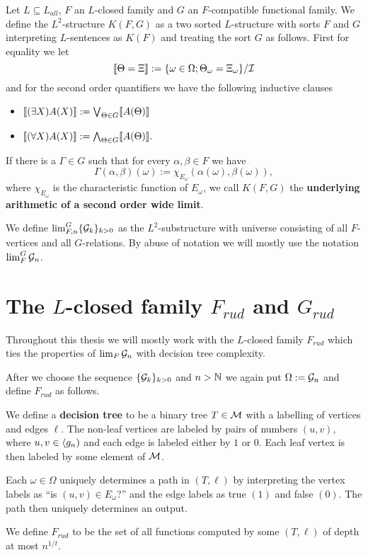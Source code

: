 \begin{defi}
Let $L\subseteq L_{all}$, $F$ an $L$-closed family and $G$ an $F$-compatible functional family. We define the $L^2$-structure $K(F,G)$ as a two sorted $L$-structure with sorts $F$ and $G$ interpreting $L$-sentences as $K(F)$ and treating the sort $G$ as follows. First for equality we let
\[\llbracket\Theta=\Xi \rrbracket := \{\omega\in \Omega;\Theta_\omega=\Xi_\omega\}/\mathcal{I}\]
and for the second order quantifiers we have the following inductive clauses
\begin{itemize}
\item $\llbracket(\exists X)A(X)\rrbracket:=\bigvee_{\Theta\in G}\llbracket A(\Theta)\rrbracket$
\item $\llbracket(\forall X)A(X)\rrbracket:=\bigwedge_{\Theta\in G}\llbracket A(\Theta)\rrbracket.$
\end{itemize}

If there is a $\Gamma\in G$ such that for every $\alpha,\beta\in F$ we have
\[\Gamma(\alpha,\beta)(\omega):=\chi_{E_\omega}(\alpha(\omega),\beta(\omega)),\]
where $\chi_{E_\omega}$ is the characteristic function of $E_\omega$, we call $K(F,G)$ the \textbf{underlying arithmetic of a second order wide limit}.

We define $\lim_{F,n}^G\{\mathcal{G}_k\}_{k>0}$ as the $L^2$-substructure with universe consisting of all $F$-vertices and all $G$-relations. By abuse of notation we will mostly use the notation $\lim_F^G\mathcal{G}_n$.
\end{defi}
 
\section{The $L$-closed family $F_{rud}$ and $G_{rud}$}

Throughout this thesis we will mostly work with the $L$-closed family $F_{rud}$ which ties the properties of $\lim_F \mathcal{G}_n$ with decision tree complexity.

After we choose the sequence $\{\mathcal{G}_k\}_{k>0}$ and $n>\mathbb{N}$ we again put $\Omega:=\mathcal{G}_n$ and define $F_{rud}$ as follows.

\begin{defi}
We define a \textbf{decision tree} to be a binary tree $T\in\mathcal{M}$ with a labelling of vertices and edges $\ell$. The non-leaf vertices are labeled by pairs of numbers $(u,v)$, where $u,v\in\langle g_n)$ and each edge is labeled either by $1$ or $0$. Each leaf vertex is then labeled by some element of $\mathcal{M}$.

Each $\omega\in\Omega$ uniquely determines a path in $(T,\ell)$ by interpreting the vertex labels as ``is $(u,v)\in E_\omega$?'' and the edge labels as true $(1)$ and false $(0)$. The path then uniquely determines an output.

We define $F_{rud}$ to be the set of all functions computed by some $(T,\ell)$ of depth at most $n^{1/t}$.
\end{defi}

